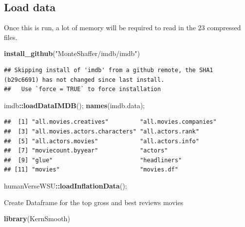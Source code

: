\documentclass[]{article}
\newenvironment{Shaded}{\begin{snugshade}}{\end{snugshade}}
\newcommand{\KeywordTok}[1]{\textcolor[rgb]{0.13,0.29,0.53}{\textbf{#1}}}
\newcommand{\NormalTok}[1]{#1}
\newcommand{\OperatorTok}[1]{\textcolor[rgb]{0.81,0.36,0.00}{\textbf{#1}}}
\newcommand{\StringTok}[1]{\textcolor[rgb]{0.31,0.60,0.02}{#1}}
\begin{document}
\hypertarget{load-data}{%
\subsection{Load data}\label{load-data}}

Once this is run, a lot of memory will be required to read in the 23
compressed files.

\begin{Shaded}
\begin{Highlighting}[]
\KeywordTok{install\_github}\NormalTok{(}\StringTok{"MonteShaffer/imdb/imdb"}\NormalTok{)}
\end{Highlighting}
\end{Shaded}

\begin{verbatim}
## Skipping install of 'imdb' from a github remote, the SHA1 (b29c6691) has not changed since last install.
##   Use `force = TRUE` to force installation
\end{verbatim}

\begin{Shaded}
\begin{Highlighting}[]
\NormalTok{imdb}\OperatorTok{::}\KeywordTok{loadDataIMDB}\NormalTok{();}
\KeywordTok{names}\NormalTok{(imdb.data);}
\end{Highlighting}
\end{Shaded}

\begin{verbatim}
##  [1] "all.movies.creatives"         "all.movies.companies"        
##  [3] "all.movies.actors.characters" "all.actors.rank"             
##  [5] "all.actors.movies"            "all.actors.info"             
##  [7] "moviecount.byyear"            "actors"                      
##  [9] "glue"                         "headliners"                  
## [11] "movies"                       "movies.df"
\end{verbatim}

\begin{Shaded}
\begin{Highlighting}[]
\NormalTok{humanVerseWSU}\OperatorTok{::}\KeywordTok{loadInflationData}\NormalTok{();}
\end{Highlighting}
\end{Shaded}

Create Dataframe for the top gross and best reviews movies

\begin{Shaded}
\begin{Highlighting}[]
\KeywordTok{library}\NormalTok{(KernSmooth)}
\end{Highlighting}
\end{Shaded}
\end{document}
